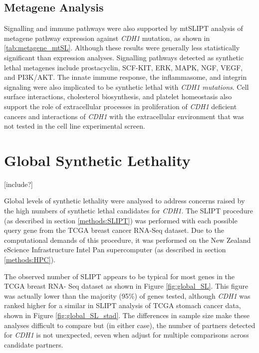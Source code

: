 \subsection{Metagene Analysis} \label{chapt3:metagene_stad_SL}


Signalling and immune pathways were also supported by mtSLIPT analysis of metagene pathway expression against \textit{CDH1} mutation, as shown in \ref{tab:metagene_mtSL}. Although these results were generally less statistically significant than expression analyses. Signalling pathways detected as synthetic lethal metagenes include prostacyclin, SCF-KIT, ERK, MAPK, NGF, VEGF, and PI3K/AKT. The innate immune response, the inflammasome, and integrin signaling were also implicated to be synthetic lethal with \textit{CDH1 mutations}. Cell surface interactions, cholesterol biosynthesis, and platelet homeostasis also support the role of extracellular processes in proliferation of \textit{CDH1} deficient cancers and interactions of \textit{CDH1} with the extracellular environment that was not tested in the cell line experimental screen.



\FloatBarrier

\section{Global Synthetic Lethality}
[include?]

Global levels of synthetic lethality were analysed to address concerns raised by the high numbers of synthetic lethal candidates for \textit{CDH1}. The SLIPT procedure (as described in section \ref{methods:SLIPT}) was performed with each possible query gene from the TCGA breast cancer RNA-Seq dataset. Due to the computational demands of this procedure, it was performed on the New Zealand eScience Infrastructure Intel Pan supercomputer (as described in section \ref{methods:HPC}).

The observed number of SLIPT appears to be typical for most genes in the TCGA breast RNA- Seq dataset as shown in Figure \ref{fig:global_SL}. This figure was actually lower than the majority (95\%) of genes tested, although \textit{CDH1} was ranked higher for a similar in SLIPT analysis of TCGA stomach cancer data, shown in Figure \ref{fig:global_SL_stad}. The differences in sample size make these analyses difficult to compare but (in either case), the number of partners detected for \textit{CDH1} is not unexpected, eeven when adjust for multiple comparisons across candidate partners.

